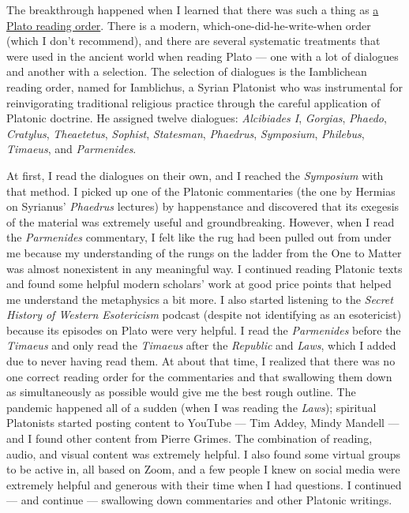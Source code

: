 \documentclass[
]{book}
\begin{document}
The breakthrough happened when I learned that there was such a thing as \href{https://www.oxfordhandbooks.com/view/10.1093/oxfordhb/9780199935314.001.0001/oxfordhb-9780199935314-e-28\#:~:text=According\%20to\%20Iamblichus\%2C\%20for\%20example,and\%20finally\%20Timaeus\%20and\%20Parmenides.}{a Plato reading order}. There is a modern, which-one-did-he-write-when order (which I don't recommend), and there are several systematic treatments that were used in the ancient world when reading Plato --- one with a lot of dialogues and another with a selection. The selection of dialogues is the Iamblichean reading order, named for Iamblichus, a Syrian Platonist who was instrumental for reinvigorating traditional religious practice through the careful application of Platonic doctrine. He assigned twelve dialogues: \emph{Alcibiades I}, \emph{Gorgias}, \emph{Phaedo}, \emph{Cratylus}, \emph{Theaetetus}, \emph{Sophist}, \emph{Statesman}, \emph{Phaedrus}, \emph{Symposium}, \emph{Philebus}, \emph{Timaeus}, and \emph{Parmenides}.

At first, I read the dialogues on their own, and I reached the \emph{Symposium} with that method. I picked up one of the Platonic commentaries (the one by Hermias on Syrianus' \emph{Phaedrus} lectures) by happenstance and discovered that its exegesis of the material was extremely useful and groundbreaking. However, when I read the \emph{Parmenides} commentary, I felt like the rug had been pulled out from under me because my understanding of the rungs on the ladder from the One to Matter was almost nonexistent in any meaningful way. I continued reading Platonic texts and found some helpful modern scholars' work at good price points that helped me understand the metaphysics a bit more. I also started listening to the \emph{Secret History of Western Esotericism} podcast (despite not identifying as an esotericist) because its episodes on Plato were very helpful. I read the \emph{Parmenides} before the \emph{Timaeus} and only read the \emph{Timaeus} after the \emph{Republic} and \emph{Laws}, which I added due to never having read them. At about that time, I realized that there was no one correct reading order for the commentaries and that swallowing them down as simultaneously as possible would give me the best rough outline. The pandemic happened all of a sudden (when I was reading the \emph{Laws}); spiritual Platonists started posting content to YouTube --- Tim Addey, Mindy Mandell --- and I found other content from Pierre Grimes. The combination of reading, audio, and visual content was extremely helpful. I also found some virtual groups to be active in, all based on Zoom, and a few people I knew on social media were extremely helpful and generous with their time when I had questions. I continued --- and continue --- swallowing down commentaries and other Platonic writings.
\end{document}
